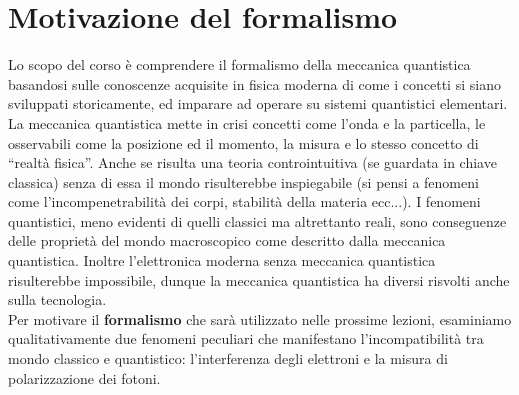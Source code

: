 \documentclass[FisicaTeorica.tex]{subfiles}
\begin{document}
\chapter{Motivazione del formalismo}













Lo scopo del corso è comprendere il formalismo della meccanica quantistica basandosi sulle conoscenze acquisite in fisica moderna di come i concetti si siano sviluppati storicamente, ed imparare ad operare su sistemi quantistici elementari. La meccanica quantistica mette in crisi concetti come l’onda e la particella, le osservabili come la posizione ed il momento, la misura e lo stesso concetto di “realtà fisica”. Anche se risulta una teoria controintuitiva (se guardata in chiave classica) senza di essa il mondo risulterebbe inspiegabile (si pensi a fenomeni come l’incompenetrabilità dei corpi, stabilità della materia ecc...). I fenomeni quantistici, meno evidenti di quelli classici ma altrettanto reali, sono conseguenze delle proprietà del mondo macroscopico come descritto dalla meccanica quantistica. Inoltre l’elettronica moderna senza meccanica quantistica risulterebbe impossibile, dunque la meccanica quantistica ha diversi risvolti anche sulla tecnologia. \\
Per motivare il \textbf{formalismo} che sarà utilizzato nelle prossime lezioni, esaminiamo qualitativamente due fenomeni peculiari che manifestano l'incompatibilità tra mondo classico e quantistico: l'interferenza degli elettroni e la misura di polarizzazione dei fotoni.
\end{document}

